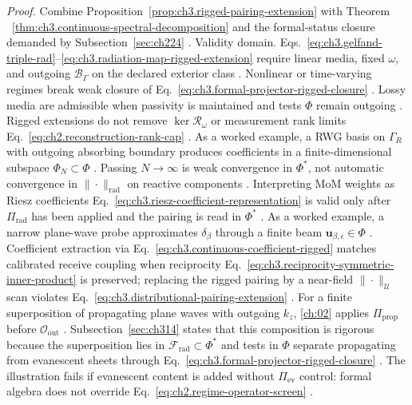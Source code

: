 \noindent\textit{Proof.}
Combine Proposition~\ref{prop:ch3.rigged-pairing-extension} with Theorem
~\ref{thm:ch3.continuous-spectral-decomposition} and the formal-status closure demanded by
Subsection~\ref{sec:ch224} \cite{stratton1941}.
Validity domain. Eqs.~\eqref{eq:ch3.gelfand-triple-rad}--\eqref{eq:ch3.radiation-map-rigged-extension} require linear
media, fixed \(\omega\), and outgoing \(\mathcal{B}_\Gamma\) on the declared exterior class
\cite{stratton1941}. Nonlinear or time-varying regimes break weak closure of
Eq.~\eqref{eq:ch3.formal-projector-rigged-closure} \cite{stratton1941}. Lossy media are admissible when
passivity is maintained and tests \(\Phi\) remain outgoing \cite{harrington2001}. Rigged extensions do not
remove \(\ker\mathcal{R}_\omega\) or measurement rank limits Eq.~\eqref{eq:ch2.reconstruction-rank-cap}
\cite{stratton1941}.
As a worked example, a RWG basis on \(\Gamma_R\) with outgoing absorbing boundary produces coefficients in a finite-dimensional
subspace \(\Phi_N\subset\Phi\) \cite{harrington2001}. Passing \(N\to\infty\) is weak
convergence in \(\Phi^{*}\), not automatic convergence in \(\|\cdot\|_{\mathrm{rad}}\) on reactive
components \cite{stratton1941}. Interpreting MoM weights as Riesz coefficients
Eq.~\eqref{eq:ch3.riesz-coefficient-representation} is valid only after \(\Pi_{\mathrm{rad}}\) has been
applied and the pairing is read in \(\Phi^{*}\) \cite{harrington2001}.
As a worked example, a narrow plane-wave probe approximates \(\delta_\beta\) through a finite beam \(\mathbf{u}_{\beta,\epsilon}\in\Phi\)
\cite{jackson1999}. Coefficient extraction via
Eq.~\eqref{eq:ch3.continuous-coefficient-rigged} matches calibrated receive coupling when reciprocity
Eq.~\eqref{eq:ch3.reciprocity-symmetric-inner-product} is preserved; replacing the rigged pairing by a
near-field \(\|\cdot\|_{\mathcal{U}}\) scan violates Eq.~\eqref{eq:ch3.distributional-pairing-extension}
\cite{stratton1941}.
For a finite superposition of propagating plane waves with outgoing \(k_z\), \ref{ch:02} applies
\(\Pi_{\mathrm{prop}}\) before \(\mathcal{O}_{\mathrm{out}}\) \cite{stratton1941}. Subsection~\ref{sec:ch314}
states that this composition is rigorous because the superposition lies in \(\mathcal{F}_{\mathrm{rad}}\subset\Phi^{*}\)
and tests in \(\Phi\) separate propagating from evanescent sheets through
Eq.~\eqref{eq:ch3.formal-projector-rigged-closure} \cite{harrington2001}. The illustration fails if
evanescent content is added without \(\Pi_{\mathrm{ev}}\) control: formal algebra does not override
Eq.~\eqref{eq:ch2.regime-operator-screen} \cite{stratton1941}.
